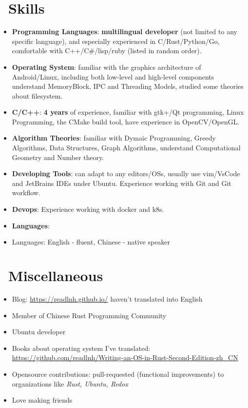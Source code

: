 \documentclass{resume}
\begin{document}
\section{\faCogs\ Skills}
\begin{itemize}[parsep=0.25ex]
  \item \textbf{Programming Languages}:
    \textbf{multilingual developer} (not limited to any specific language),
    and especially experienced in C/Rust/Python/Go,
    comfortable with C++/C\#/lisp/ruby (listed in random order).

  \item \textbf{Operating System}:
    familiar with the graphics architecture of Android/Linux, including both low-level and high-level components
    understand MemoryBlock, IPC and Threading Models, studied some theories about filesystem.

  \item \textbf{C/C++}:
    \textbf{4 years} of experience,
    familiar with gtk+/Qt programming, Linux Programming, the CMake build tool, have experience
    in OpenCV/OpenGL.

  \item \textbf{Algorithm Theories}:
    familiar with Dymaic Programming, Greedy Algorithms, Data Structures, Graph Algorithms,
    understand Computational Geometry and Number theory.

  \item \textbf{Developing Tools}:
    can adapt to any editors/OSs, usually use vim/VsCode and JetBrains IDEs under Ubuntu.
    Experience working with Git and Git workflow.

  \item \textbf{Devops}:
    Experience working with docker and k8s.      

 \item \textbf{Languages}:
    \item Languages: English - fluent, Chinese - native speaker
\end{itemize}



\section{\faInfo\ Miscellaneous}
\begin{itemize}[parsep=0.25ex]
  \item Blog: \url{https://readlnh.github.io/} haven't translated into English
  \item Member of Chinese Rust Programming Community
  \item Ubuntu developer
  \item Books about operating system I've translated: \url{https://github.com/readlnh/Writing-an-OS-in-Rust-Second-Edition-zh_CN}
  \item Opensource contributions: 
    pull-requested (functional improvements) to organizations like \textit{Rust, Ubuntu, Redox}
  \item Love making friends
\end{itemize}

%
%
\end{document}
